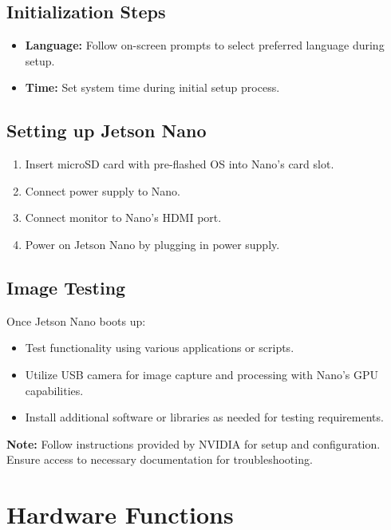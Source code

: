 \subsection*{Initialization Steps}
\begin{itemize}[label={$\bullet$}]
	\item \textbf{Language:} Follow on-screen prompts to select preferred language during setup.
	\item \textbf{Time:} Set system time during initial setup process.
\end{itemize}

\subsection*{Setting up Jetson Nano}
\begin{enumerate}[label={\arabic*.}]
	\item Insert microSD card with pre-flashed OS into Nano's card slot.
	\item Connect power supply to Nano.
	\item Connect monitor to Nano's HDMI port.
	\item Power on Jetson Nano by plugging in power supply.
\end{enumerate}

\subsection*{Image Testing}
Once Jetson Nano boots up:
\begin{itemize}[label={$\bullet$}]
	\item Test functionality using various applications or scripts.
	\item Utilize USB camera for image capture and processing with Nano's GPU capabilities.
	\item Install additional software or libraries as needed for testing requirements.
\end{itemize}

\textbf{Note:} Follow instructions provided by NVIDIA for setup and configuration. Ensure access to necessary documentation for troubleshooting.

\section{Hardware Functions}

